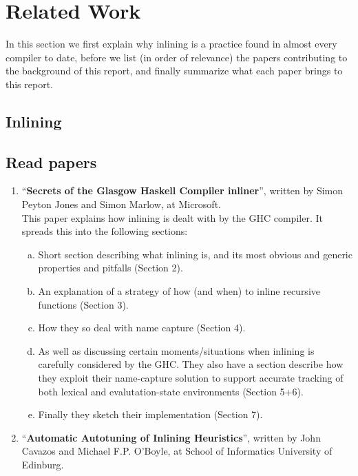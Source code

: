 
\section{Related Work}

In this section we first explain why inlining is a practice found in almost
every compiler to date, before we list (in order of relevance) the
papers contributing to the background of this report, and finally summarize what
each paper brings to this report.

\subsection{Inlining}

\subsection{Read papers}

\begin{enumerate}[1)]
	\item ``\textbf{Secrets of the Glasgow Haskell Compiler inliner}'', written
by Simon Peyton Jones and Simon Marlow, at Microsoft. \\

This paper explains how inlining is dealt with by the GHC compiler. It spreads
this into the following sections:
\begin{enumerate}[a)]
	\item Short section describing what inlining is, and its most obvious and
generic properties and pitfalls (Section 2).
	\item An explanation of a strategy of how (and when) to inline recursive
functions (Section 3).
	\item How they so deal with name capture (Section 4).
	\item As well as discussing certain moments/situations when inlining is
carefully considered by the GHC. They also have a section describe how they
exploit their name-capture solution to support accurate tracking of both lexical
and evalutation-state environments (Section 5+6).
	\item Finally they sketch their implementation (Section 7).
\end{enumerate}

	\item ``\textbf{Automatic Autotuning of Inlining Heuristics}'', written by
John Cavazos and Michael F.P. O'Boyle, at School of Informatics University of
Edinburg. \\

\end{enumerate}
